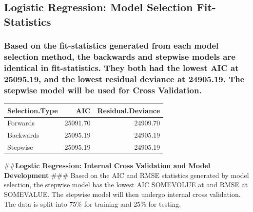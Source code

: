 \documentclass[american,]{article}
\begin{document}
\hypertarget{logistic-regression-model-selection-fit-statistics}{%
\subsection{\texorpdfstring{\textbf{Logistic Regression: Model Selection Fit-Statistics}}{Logistic Regression: Model Selection Fit-Statistics}}\label{logistic-regression-model-selection-fit-statistics}}

\hypertarget{based-on-the-fit-statistics-generated-from-each-model-selection-method-the-backwards-and-stepwise-models-are-identical-in-fit-statistics.-they-both-had-the-lowest-aic-at-25095.19-and-the-lowest-residual-deviance-at-24905.19.-the-stepwise-model-will-be-used-for-cross-validation.}{%
\subsubsection{Based on the fit-statistics generated from each model selection method, the backwards and stepwise models are identical in fit-statistics. They both had the lowest AIC at 25095.19, and the lowest residual deviance at 24905.19. The stepwise model will be used for Cross Validation.}\label{based-on-the-fit-statistics-generated-from-each-model-selection-method-the-backwards-and-stepwise-models-are-identical-in-fit-statistics.-they-both-had-the-lowest-aic-at-25095.19-and-the-lowest-residual-deviance-at-24905.19.-the-stepwise-model-will-be-used-for-cross-validation.}}

\begin{table}[H]
\centering
\begin{tabular}{lrr}
\toprule
Selection.Type & AIC & Residual.Deviance\\
\midrule
Forwards & 25091.70 & 24909.70\\
Backwards & 25095.19 & 24905.19\\
Stepwise & 25095.19 & 24905.19\\
\bottomrule
\end{tabular}
\end{table}

\#\#\textbf{Logstic Regression: Internal Cross Validation and Model Development}
\#\#\# Based on the AIC and RMSE statistics generated by model selection, the stepwise model has the lowest AIC SOMEVOLUE at and RMSE at SOMEVALUE. The stepwise model will then undergo internal cross validation. The data is split into 75\% for training and 25\% for testing.
\end{document}
